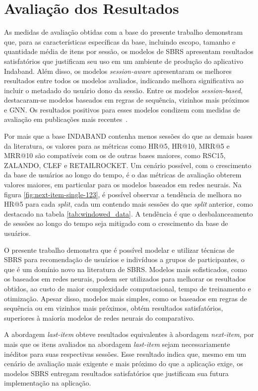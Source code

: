 \section{Avaliação dos Resultados}

As medidas de avaliação obtidas com a base do presente trabalho demonstram que,
para as características específicas da base, incluindo escopo, tamanho e
quantidade média de itens por sessão, os modelos de SBRS apresentam resultados
satisfatórios que justificam seu uso em um ambiente de produção do aplicativo
Indaband. Além disso, os modelos \textit{session-aware} apresentaram os melhores
resultados entre todos os modelos avaliados, indicando melhora significativa ao
incluir o metadado do usuário dono da sessão. Entre os modelos
\textit{session-based}, destacaram-se modelos baseados em regras de sequência,
vizinhos mais próximos e GNN. Os resultados positivos para esses modelos
condizem com medidas de avaliação em publicações mais
recentes~\cite{shehzad2024performance}.

Por mais que a base INDABAND contenha menos sessões do que as demais bases da
literatura, os valores para as métricas como HR@5, HR@10, MRR@5 e MRR@10 são
compatíveis com os de outras bases maiores, como RSC15, ZALANDO, CLEF e
RETAILROCKET. Um cenário possível, com o crescimento da base de usuários ao
longo do tempo, é o das métricas de avaliação obterem valores maiores, em
particular para os modelos baseados em redes neurais. Na figura
\ref{fig:next-item-single-123}, é possível observar a tendência de melhora no
HR@5 para cada \textit{split}, cada um contendo mais sessões do que
\textit{split} anterior, como destacado na tabela \ref{tab:windowed_data}. A
tendência é que o desbalanceamento de sessões ao longo do tempo seja mitigado
com o crescimento da base de usuários.

O presente trabalho demonstra que é possível modelar e utilizar técnicas de SBRS
para recomendação de usuários e indivíduos a grupos de participantes, o que é um
domínio novo na literatura de SBRS. Modelos mais sofisticados, como os baseados
em redes neurais, podem ser utilizados para melhorar os resultados obtidos, ao
custo de maior complexidade computacional, tempo de treinamento e otimização.
Apesar disso, modelos mais simples, como os baseados em regras de sequência ou
em vizinhos mais próximos, obtém resultados satisfatórios, superiores à maioria
modelos de redes neurais do comparativo.

A abordagem \textit{last-item} obteve resultados equivalentes à abordagem
\textit{next-item}, por mais que os itens avaliados na abordagem
\textit{last-item} sejam necessariamente inéditos para suas respectivas sessões.
Esse resultado indica que, mesmo em um cenário de avaliação mais exigente e mais
próximo do que a aplicação exige, os modelos SBRS entregam resultados
satisfatórios que justificam sua futura implementação na aplicação.
